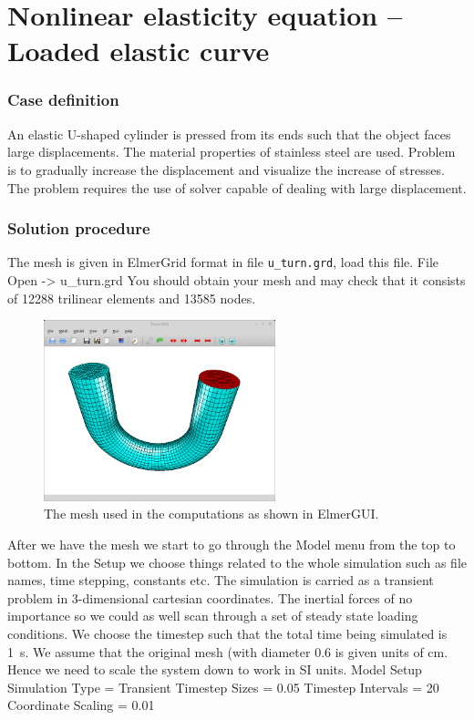 \chapter{Nonlinear elasticity equation -- Loaded elastic curve}



\subsection*{Case definition}

An elastic U-shaped cylinder is pressed from its ends such that
the object faces large displacements. The material properties of
stainless steel are used. Problem is to gradually increase the displacement
and visualize the increase of stresses. The problem requires the use
of solver capable of dealing with large displacement.


\subsection*{Solution procedure}

The mesh is given in ElmerGrid format in file \texttt{u\_turn.grd},
load this file.
\ttbegin
File 
  Open -> u\_turn.grd
\ttend
You should obtain your mesh and may check that it consists of 12288 trilinear elements and 13585 nodes.
\begin{figure}[h!]
\begin{center}
  \includegraphics[width=0.6\textwidth]{UturnElmerGUI}
  \caption{The mesh used in the computations as shown in ElmerGUI.}
  \label{fig:UturnElmerGUI}
\end{center}
\end{figure}

After we have the mesh we start to go through the Model menu from the top to bottom. 
In the Setup we choose things related to the whole simulation such as file names, 
time stepping, constants etc.
The simulation is carried as a transient problem in 3-dimensional cartesian
coordinates. The inertial forces of no importance so we could as well scan through a set of steady state
loading conditions. We choose the timestep such that the total time being simulated is 1~s.
We assume that the original mesh (with diameter 0.6 is given units of cm. Hence we need to scale the
system down to work in SI units. 
\ttbegin
Model
  Setup 
    Simulation Type = Transient
    Timestep Sizes = 0.05
    Timestep Intervals = 20
    Coordinate Scaling = 0.01
\ttend

